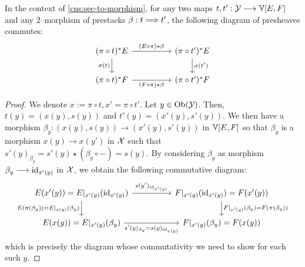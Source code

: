 \documentclass[11pt]{amsart}
\begin{document}

\begin{prop}\label{prop:section-nat}
In the context of \cref{cns:sec-to-morphism},
for any two maps $t, t' : \mcY \to \bV[E, F]$ and any $2$--morphism of prestacks
$\beta : t \To t'$, the following diagram of presheaves commutes:
\[\begin{tikzcd}[column sep=huge]
(\pi \circ t)^*E \ar[r, "(E \circ \pi) \star \beta"] \ar[d, "\sigma(t)" left] &
(\pi \circ t')^*E \ar[d, "\sigma(t')"] \\
(\pi \circ t)^*F \ar[r, "(F \circ \pi) \star \beta" below] & (\pi \circ t')^*F
\end{tikzcd}\]
\end{prop}
\begin{proof}
We denote $x := \pi \circ t, x' = \pi \circ t'$.
Let $y \in \Ob{\mcY}$. Then, $t(y) = (x(y), s(y))$ and $t'(y) = (x'(y), s'(y))$.
We then have a morphism $\beta_y : (x(y), s(y)) \to (x'(y), s'(y))$
in $\mathbb{V}[E, F]$ so that $\beta_y$ is a morphism $x(y) \to x(y')$ in $\mathcal{X}$
such that $s'(y)_{\beta_y} = s'(y) \star (\beta_y \circ -) = s(y)$.
By considering $\beta_y$ as morphism $\beta_y \to \id_{x'(y)}$ in $\mathcal{X}$,
we obtain the following commutative diagram:
\[\begin{tikzcd}[column sep=huge]
E(x'(y)) = E|_{x'(y)}(\id_{x'(y)})
  \ar[r, "s(y')_{\id_{x'(y)}}"]
  \ar[d, "E(\pi(\beta_y)) = E|_{x(y)}(\beta_y)" left] &
F|_{x'(y)}(\id_{x'(y)}) = F(x'(y))
  \ar[d, "F|_{x'(y)}(\beta_y) = F(\pi(\beta_y))"] \\
E(x(y)) = E|_{x'(y)}(\beta_y)
  \ar[r, "s'(y)_{\beta_y} = s(y)_{\id_{x(y)}}" below] &
F|_{x'(y)}(\beta_y) = F(x(y))
\end{tikzcd}\]
which is precisely the diagram whose commutativity we need to show for each such
$y$.
\end{proof}
\end{document}
